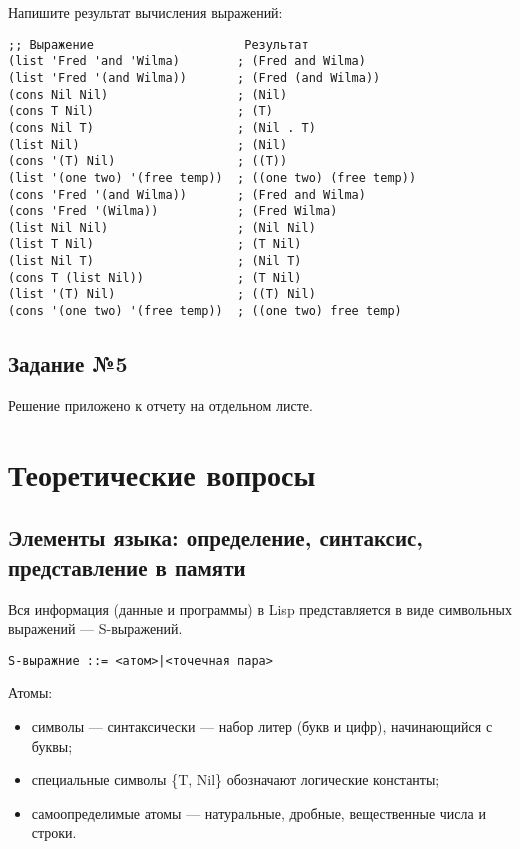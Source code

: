 Напишите результат вычисления выражений:

\vspace{4mm}
\begin{minipage}{0.92\linewidth}
\begin{lstlisting}
;; Выражение                     Результат
(list 'Fred 'and 'Wilma)        ; (Fred and Wilma)
(list 'Fred '(and Wilma))       ; (Fred (and Wilma))
(cons Nil Nil)                  ; (Nil)
(cons T Nil)                    ; (T)
(cons Nil T)                    ; (Nil . T)
(list Nil)                      ; (Nil)
(cons '(T) Nil)                 ; ((T))
(list '(one two) '(free temp))  ; ((one two) (free temp))
(cons 'Fred '(and Wilma))       ; (Fred and Wilma)
(cons 'Fred '(Wilma))           ; (Fred Wilma)
(list Nil Nil)                  ; (Nil Nil)
(list T Nil)                    ; (T Nil)
(list Nil T)                    ; (Nil T)
(cons T (list Nil))             ; (T Nil)
(list '(T) Nil)                 ; ((T) Nil)
(cons '(one two) '(free temp))  ; ((one two) free temp)
\end{lstlisting}
\end{minipage}


\section{Задание №5}

Решение приложено к отчету на отдельном листе.

\chapter{Теоретические вопросы}

\section{Элементы языка: определение, синтаксис, представление в памяти}

Вся информация (данные и программы) в Lisp представляется в виде символьных
выражений --- S-выражений.

\vspace{4mm}
\begin{minipage}{0.92\linewidth}
\begin{lstlisting}
S-выражние ::= <атом>|<точечная пара>
\end{lstlisting}
\end{minipage}

Атомы:
\begin{itemize}
    \item символы --- синтаксически --- набор литер (букв и цифр), начинающийся
        с буквы;
    \item специальные символы \{T, Nil\} обозначают логические константы;
    \item самоопределимые атомы --- натуральные, дробные, вещественные
        числа и строки.
\end{itemize}

